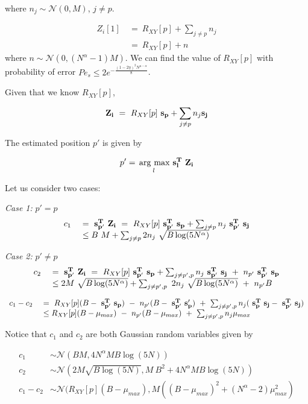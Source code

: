 where $n_j \sim \mathcal{N}(0,M)$, $j \neq p$.

\[\begin{array}{ll}
Z_i[1] \ &= \ R_{XY}[p] + \sum_{j \neq p}n_j \\
         &= \ R_{XY}[p] + n 
\end{array}
\]
where $n \sim \mathcal{N}(0,(N^\alpha-1)M)$. We can find the value of $R_{XY}[p]$ with probability of error $Pe_s \leq 2 e^{- \frac{(1-2\eta)^2N^{\mu-\alpha}}{8}}$.

Given that we know $R_{XY}[p]$, 

\[ \mathbf{Z_i} \ = \ R_{XY}[p] ~ \mathbf{s_p}+ \sum_{j \neq p}n_j \mathbf{s_j} \\
\]

The estimated position $p'$ is given by

\[ p' = \underset{l}{\operatorname*{\,arg\ max}}\ \bf s^T_l ~ Z_i\]

Let us consider two cases:

{\textit{Case 1:} $p' = p$}
 \[
 \begin{array}{ll}
 c_1 \ &= \ \mathbf{s^T_{p'}} ~\mathbf{Z_i} \ = \ R_{XY}[p] {\bf ~s^T_{p'}~ s_p}+ \sum_{j \neq p}n_j {\bf ~s^T_{p'}~ s_j}\\
       &\leq B ~ M +  \sum_{j \neq p} 2 n_j ~ \sqrt{B\log(5N^{\alpha})}  
 \end{array} 
  \]
  
{\textit{Case 2:} $p' \neq p$}
\[
\begin{array}{ll}
c_2 \ &= \ \mathbf{s^T_{p'}} ~\mathbf{Z_i}\ = \ R_{XY}[p]  {\bf ~s^T_{p'}~ s_p}+ \sum_{j \neq p',p}n_j{\bf ~s^T_{p'}~ s_j} \ + \ n_{p'} {\bf ~s^T_{p'}~ s_p} \\
&\leq 2M ~ \sqrt{B\log(5N^{\alpha})} + \sum_{j \neq p',p} \ 2n_j ~ \sqrt{B\log(5N^{\alpha})} \ + \ n_{p'} B
\end{array} 
\]

\[
\begin{array}{ll}
c_1 - c_2 \ &=  \ R_{XY}[p](B - {\bf ~s^T_{p'}~ s_p}) \ - \ n_{p'}(B - {\bf ~s^T_{p'}~ s_p'}) ~ + ~ \sum_{j \neq p',p}n_j ({\bf ~s^T_{p}~ s_j} - {\bf ~s^T_{p'}~ s_j})   \\
&\leq R_{XY}[p] (B-\mu_{max})  \ - \ n_{p'}(B - \mu_{max}) ~ + ~ \sum_{j \neq p',p}n_j \mu_{max} \\
\end{array} 
\]


Notice that $c_1$ and $c_2$ are both Gaussian random variables given by

\[ \begin{array}{ll}
c_1 &\sim  \mathcal{N}(BM,4N^\alpha M B \log(5N)) \\
c_2 &\sim  \mathcal{N}(2M \sqrt{B\log(5N)}, M~B^2 + 4N^\alpha M B \log(5N))\\
c_1 - c_2 &\sim  \mathcal{N}(R_{XY}[p](B-\mu_{max}),M((B-\mu_{max})^2 + (N^{\alpha}-2)\mu_{max}^2)
\end{array}\]

